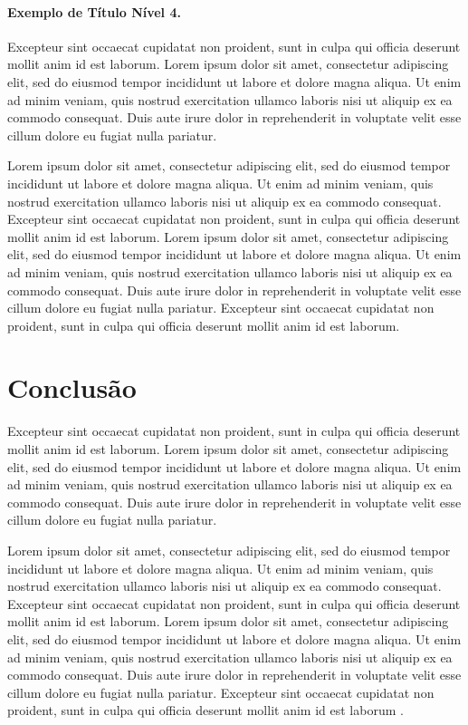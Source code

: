 \documentclass[spanish]{sbc2025}%
\begin{document}
\paragraph{Exemplo de Título Nível 4.}

Excepteur sint occaecat cupidatat non proident, sunt in culpa qui officia deserunt mollit anim id est laborum. Lorem ipsum dolor sit amet, consectetur adipiscing elit, sed do eiusmod tempor incididunt ut labore et dolore magna aliqua. Ut enim ad minim veniam, quis nostrud exercitation ullamco laboris nisi ut aliquip ex ea commodo consequat. Duis aute irure dolor in reprehenderit in voluptate velit esse cillum dolore eu fugiat nulla pariatur. 

Lorem ipsum dolor sit amet, consectetur adipiscing elit, sed do eiusmod tempor incididunt ut labore et dolore magna aliqua. Ut enim ad minim veniam, quis nostrud exercitation ullamco laboris nisi ut aliquip ex ea commodo consequat. Excepteur sint occaecat cupidatat non proident, sunt in culpa qui officia deserunt mollit anim id est laborum. Lorem ipsum dolor sit amet, consectetur adipiscing elit, sed do eiusmod tempor incididunt ut labore et dolore magna aliqua. Ut enim ad minim veniam, quis nostrud exercitation ullamco laboris nisi ut aliquip ex ea commodo consequat. Duis aute irure dolor in reprehenderit in voluptate velit esse cillum dolore eu fugiat nulla pariatur. Excepteur sint occaecat cupidatat non proident, sunt in culpa qui officia deserunt mollit anim id est laborum.

\section{Conclusão}

Excepteur sint occaecat cupidatat non proident, sunt in culpa qui officia deserunt mollit anim id est laborum. Lorem ipsum dolor sit amet, consectetur adipiscing elit, sed do eiusmod tempor incididunt ut labore et dolore magna aliqua. Ut enim ad minim veniam, quis nostrud exercitation ullamco laboris nisi ut aliquip ex ea commodo consequat. Duis aute irure dolor in reprehenderit in voluptate velit esse cillum dolore eu fugiat nulla pariatur. 

Lorem ipsum dolor sit amet, consectetur adipiscing elit, sed do eiusmod tempor incididunt ut labore et dolore magna aliqua. Ut enim ad minim veniam, quis nostrud exercitation ullamco laboris nisi ut aliquip ex ea commodo consequat. Excepteur sint occaecat cupidatat non proident, sunt in culpa qui officia deserunt mollit anim id est laborum. Lorem ipsum dolor sit amet, consectetur adipiscing elit, sed do eiusmod tempor incididunt ut labore et dolore magna aliqua. Ut enim ad minim veniam, quis nostrud exercitation ullamco laboris nisi ut aliquip ex ea commodo consequat. Duis aute irure dolor in reprehenderit in voluptate velit esse cillum dolore eu fugiat nulla pariatur. Excepteur sint occaecat cupidatat non proident, sunt in culpa qui officia deserunt mollit anim id est laborum \citep{ref5}.
\end{document}

